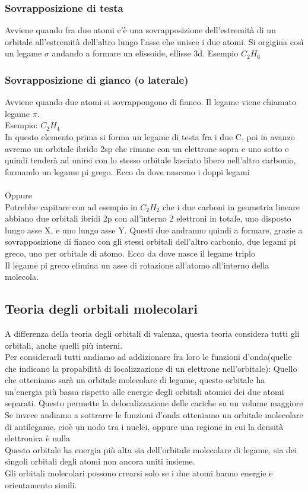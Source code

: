 \subsubsection{Sovrapposizione di testa}
Avviene quando fra due atomi c'è una sovrapposizione dell'estremità di un orbitale all'estremità dell'altro lungo l'asse che unisce i due atomi. Si orgigina così un legame $\sigma$ andando a formare un elissoide, ellisse 3d. Esempio $C_2H_6$
\subsubsection{Sovrapposizione di gianco (o laterale)}
Avviene quando due atomi si sovrappongono di fianco. Il legame viene chiamato legame $\pi$.\\
Esempio: $C_2H_4$\\
In questo elemento prima si forma un legame di testa fra i due C, poi in avanzo avremo un orbitale ibrido 2sp che rimane con un elettrone sopra e uno sotto e quindi tenderà ad unirsi con lo stesso orbitale lasciato libero nell’altro carbonio, formando un legame pi grego. Ecco da dove nascono i doppi legami\\\\
Oppure\\
Potrebbe capitare con ad esempio in $C_2H_2$ che i due carboni in geometria lineare abbiano due orbitali ibridi 2p con all’interno 2 elettroni in totale, uno disposto lungo asse X, e uno lungo asse Y. Questi due andranno quindi a formare, grazie a sovrapposizione di fianco con gli stessi orbitali dell’altro carbonio, due legami pi greco, uno per orbitale di atomo. Ecco da dove nasce il legame triplo\\
Il legame pi greco elimina un asse di rotazione all’atomo all’interno della molecola.
\subsection{Teoria degli orbitali molecolari}
A differenza della teoria degli orbitali di valenza, questa teoria considera tutti gli orbitali, anche quelli più interni.\\
Per considerarli tutti andiamo ad addizionare fra loro le funzioni d’onda(quelle che indicano la propabilità di localizzazione di un elettrone nell’orbitale): Quello che otteniamo sarà un orbitale molecolare di legame, questo orbitale ha un'energia più bassa rispetto alle energie degli orbitali atomici dei due atomi separati. Questo permette la delocalizzazione delle cariche su un volume maggiore \\
Se invece andiamo a sottrarre le funzioni d’onda otteniamo un orbitale molecolare di antilegame, cioè un nodo tra i nuclei, oppure una regione in cui la densità elettronica è nulla\\
Questo orbitale ha energia più alta sia dell’orbitale molecolare di legame, sia dei singoli orbitali degli atomi non ancora uniti insieme.\\
Gli orbitali molecolari possono crearsi solo se i due atomi hanno energie e orientamento simili. 
